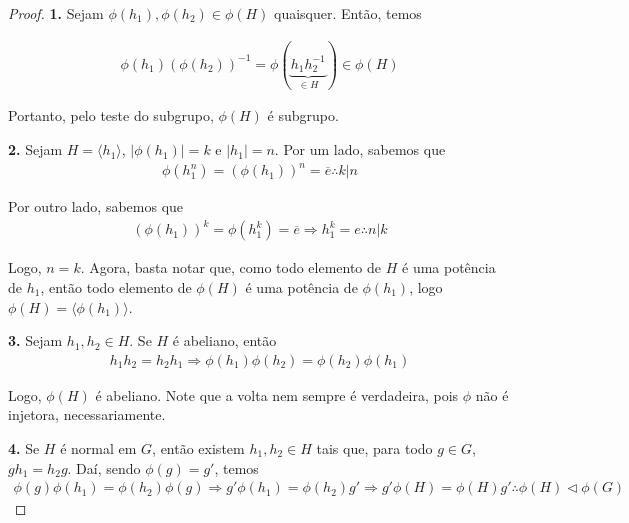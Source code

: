 \documentclass[a4paper,portuguese,11pt,twoside, leqno]{book}
\theoremstyle{definition}
\begin{document}
	\begin{proof}
		\textbf{1.} Sejam $\phi(h_1), \phi(h_2)\in \phi(H)$ quaisquer. Então, temos
		
		\begin{align*}
		\phi(h_1)(\phi(h_2))^{-1} = \phi(\underbrace{h_1h_2^{-1}}_{\in H}) \in\phi(H)
		\end{align*}
		
		\par\vspace{0.3cm} Portanto, pelo teste do subgrupo, $\phi(H)$ é subgrupo.
		
		\par\vspace{0.3cm}\hspace{17pt}\textbf{2.} Sejam $H = \langle h_1 \rangle$, $|\phi(h_1)| = k$ e $|h_1| = n$. Por um lado, sabemos que
		\begin{align*}
		\phi(h_1^n) = (\phi(h_1))^n = \overline{e}\therefore k|n
		\end{align*}
		\par\vspace{0.3cm} Por outro lado, sabemos que
		\begin{align*}
		(\phi(h_1))^k = \phi(h_1^k) = \overline{e}\Rightarrow h_1^k = e\therefore n|k
		\end{align*}
		
		\par\vspace{0.3cm} Logo, $n = k$. Agora, basta notar que, como todo elemento de $H$ é uma potência de $h_1$, então todo elemento de $\phi(H)$ é uma potência de $\phi(h_1)$, logo $\phi(H) = \langle \phi(h_1) \rangle$. 
		
		\par\vspace{0.3cm}\hspace{17pt}\textbf{3.} Sejam $h_1, h_2\in H$. Se $H$ é abeliano, então
		\begin{align*}
		h_1h_2 = h_2h_1 \Rightarrow \phi(h_1)\phi(h_2) = \phi(h_2)\phi(h_1)
		\end{align*}
		
		\par\vspace{0.3cm} Logo, $\phi(H)$ é abeliano. Note que a volta nem sempre é verdadeira, pois $\phi$ não é injetora, necessariamente.
		
		\par\vspace{0.3cm}\hspace{17pt}\textbf{4.} Se $H$ é normal em $G$, então existem $h_1, h_2\in H$ tais que, para todo $g\in G$, $gh_1 = h_2g$. Daí, sendo $\phi(g) = g'$, temos
		\begin{align*}
		\phi(g)\phi(h_1) = \phi(h_2)\phi(g) \Rightarrow g'\phi(h_1) = \phi(h_2)g' \Rightarrow g'\phi(H) = \phi(H)g' \therefore \phi(H)\vartriangleleft\phi(G)
		\end{align*}
		

\end{proof}
\end{document}
